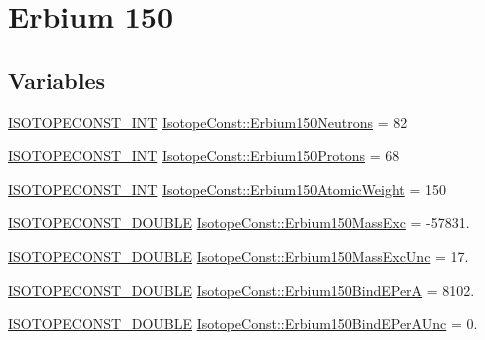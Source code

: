 \hypertarget{group___isotope_const-_erbium-_er150}{}\section{Erbium 150}
\label{group___isotope_const-_erbium-_er150}
\subsection*{Variables}
\begin{DoxyCompactItemize}
\item 
\mbox{\hyperlink{group___isotope_const-_macros_ga5f18360b3e99483a35c32d789e62621c}{I\+S\+O\+T\+O\+P\+E\+C\+O\+N\+S\+T\+\_\+\+I\+NT}} \mbox{\hyperlink{group___isotope_const-_erbium-_er150_ga5f51f3e79dd3ad4ee8f0737c7a47428d}{Isotope\+Const\+::\+Erbium150\+Neutrons}} = 82
\item 
\mbox{\hyperlink{group___isotope_const-_macros_ga5f18360b3e99483a35c32d789e62621c}{I\+S\+O\+T\+O\+P\+E\+C\+O\+N\+S\+T\+\_\+\+I\+NT}} \mbox{\hyperlink{group___isotope_const-_erbium-_er150_gacb898bacf3cc6a4d56494ecd7f1f2c92}{Isotope\+Const\+::\+Erbium150\+Protons}} = 68
\item 
\mbox{\hyperlink{group___isotope_const-_macros_ga5f18360b3e99483a35c32d789e62621c}{I\+S\+O\+T\+O\+P\+E\+C\+O\+N\+S\+T\+\_\+\+I\+NT}} \mbox{\hyperlink{group___isotope_const-_erbium-_er150_gafafb2c8cc373ddf6e4c3c97c235804b5}{Isotope\+Const\+::\+Erbium150\+Atomic\+Weight}} = 150
\item 
\mbox{\hyperlink{group___isotope_const-_macros_ga8f45a7272ce02c0b4c65c44636ed719a}{I\+S\+O\+T\+O\+P\+E\+C\+O\+N\+S\+T\+\_\+\+D\+O\+U\+B\+LE}} \mbox{\hyperlink{group___isotope_const-_erbium-_er150_ga8764e1886db340d69b68748b1c272f37}{Isotope\+Const\+::\+Erbium150\+Mass\+Exc}} = -\/57831.
\item 
\mbox{\hyperlink{group___isotope_const-_macros_ga8f45a7272ce02c0b4c65c44636ed719a}{I\+S\+O\+T\+O\+P\+E\+C\+O\+N\+S\+T\+\_\+\+D\+O\+U\+B\+LE}} \mbox{\hyperlink{group___isotope_const-_erbium-_er150_gad4f871fb875bccea2325b1343b995dbf}{Isotope\+Const\+::\+Erbium150\+Mass\+Exc\+Unc}} = 17.
\item 
\mbox{\hyperlink{group___isotope_const-_macros_ga8f45a7272ce02c0b4c65c44636ed719a}{I\+S\+O\+T\+O\+P\+E\+C\+O\+N\+S\+T\+\_\+\+D\+O\+U\+B\+LE}} \mbox{\hyperlink{group___isotope_const-_erbium-_er150_ga28b4fc80789457f12545a87dbcedf587}{Isotope\+Const\+::\+Erbium150\+Bind\+E\+PerA}} = 8102.
\item 
\mbox{\hyperlink{group___isotope_const-_macros_ga8f45a7272ce02c0b4c65c44636ed719a}{I\+S\+O\+T\+O\+P\+E\+C\+O\+N\+S\+T\+\_\+\+D\+O\+U\+B\+LE}} \mbox{\hyperlink{group___isotope_const-_erbium-_er150_gaaae7087e05c895130c368d9472ebc164}{Isotope\+Const\+::\+Erbium150\+Bind\+E\+Per\+A\+Unc}} = 0.

\end{DoxyCompactItemize}
